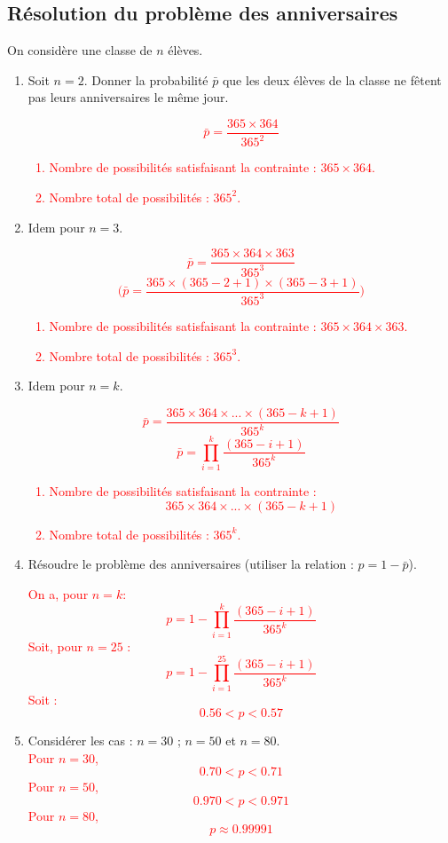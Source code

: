 \subsection{Résolution du problème des anniversaires}
On considère une classe de $n$ élèves.
\begin{enumerate}
	\item Soit $n=2$. Donner la probabilité $\bar{p}$ que les deux élèves de la
	classe ne fêtent pas leurs anniversaires le même jour.
	\textcolor{red}{
		$$\bar{p} = \frac{365\times 364}{365^2}$$
		\begin{enumerate}
			\item Nombre de possibilités satisfaisant la contrainte : $365\times 364$.
			\item Nombre total de possibilités : $365^2$. 
		\end{enumerate}
	}
	
	\item Idem pour $n=3$.
	\textcolor{red}{
		$$\bar{p} = 
		\frac{365\times 364 \times 363}{365^3}
		$$
		$$
		\big(
		\bar{p}=
		\frac{365\times (365-2+1) \times (365-3+1)}{365^3}
		\big)
		$$
		\begin{enumerate}
			\item Nombre de possibilités satisfaisant la contrainte : 
			$365\times 364\times 363$.
			\item Nombre total de possibilités : $365^3$. 
		\end{enumerate}
	}
	
	\item Idem pour $n=k$.
	\textcolor{red}{
		$$\bar{p} = \frac{365\times 364\times ... \times (365-k+1)}{365^k}$$
		$$\bar{p} =
		\prod_{i=1}^{k} \frac{(365-i+1)}{365^k}
		$$
		\begin{enumerate}
			\item Nombre de possibilités satisfaisant la contrainte : 
			$$365\times 364\times ... \times (365-k+1)$$
			\item Nombre total de possibilités : $365^k$. 
		\end{enumerate}
	}
	
	\item 
	Résoudre le problème des anniversaires
	(utiliser la relation : $p=1-\bar{p}$).
	
	\textcolor{red}{
		On a, pour $n=k$: 
		$$
		p = 1 - \prod_{i=1}^{k} \frac{(365-i+1)}{365^k}
		$$
		Soit, pour $n=25$ :
		$$p =
		1 - \prod_{i=1}^{25} \frac{(365-i+1)}{365^k}
		$$
		Soit : 
		$$ 0.56 < p < 0.57$$
	}
	
	\item Considérer les cas : $n=30$ ; $n=50$ et $n=80$.
	\textcolor{red}{
		\\
		Pour $n=30$,
		$$ 0.70 < p < 0.71$$
		Pour $n=50$,
		$$ 0.970 < p < 0.971$$
		Pour $n=80$,
		$$ p \approx 0.99991$$
	}
\end{enumerate}

